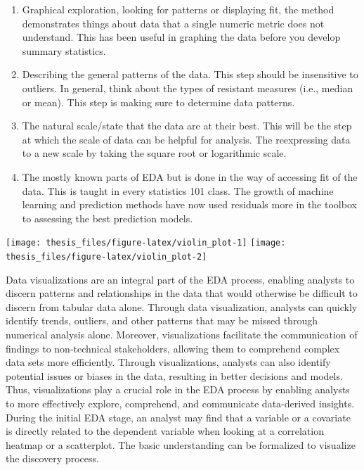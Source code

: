 \documentclass[print]{nuthesis}
\begin{document}
\begin{enumerate}
\def\labelenumi{\arabic{enumi}.}
\item
  Graphical exploration, looking for patterns or displaying fit, the method demonstrates things about data that a single numeric metric does not understand.
  This has been useful in graphing the data before you develop summary statistics.
\item
  Describing the general patterns of the data.
  This step should be insensitive to outliers.
  In general, think about the types of resistant measures (i.e., median or mean).
  This step is making sure to determine data patterns.
\item
  The natural scale/state that the data are at their best.
  This will be the step at which the scale of data can be helpful for analysis.
  The reexpressing data to a new scale by taking the square root or logarithmic scale.
\item
  The mostly known parts of EDA but is done in the way of accessing fit of the data.
  This is taught in every statistics 101 class.
  The growth of machine learning and prediction methods have now used residuals more in the toolbox to assessing the best prediction models.
\end{enumerate}

\begin{center}\texttt{[image: thesis\_files/figure-latex/violin\_plot-1]} \texttt{[image: thesis\_files/figure-latex/violin\_plot-2]} \end{center}

Data visualizations are an integral part of the EDA process, enabling analysts to discern patterns and relationships in the data that would otherwise be difficult to discern from tabular data alone.
Through data visualization, analysts can quickly identify trends, outliers, and other patterns that may be missed through numerical analysis alone.
Moreover, visualizations facilitate the communication of findings to non-technical stakeholders, allowing them to comprehend complex data sets more efficiently.
Through visualizations, analysts can also identify potential issues or biases in the data, resulting in better decisions and models.
Thus, visualizations play a crucial role in the EDA process by enabling analysts to more effectively explore, comprehend, and communicate data-derived insights.
During the initial EDA stage, an analyst may find that a variable or a covariate is directly related to the dependent variable when looking at a correlation heatmap or a scatterplot.
The basic understanding can be formalized to visualize the discovery process.
\end{document}
